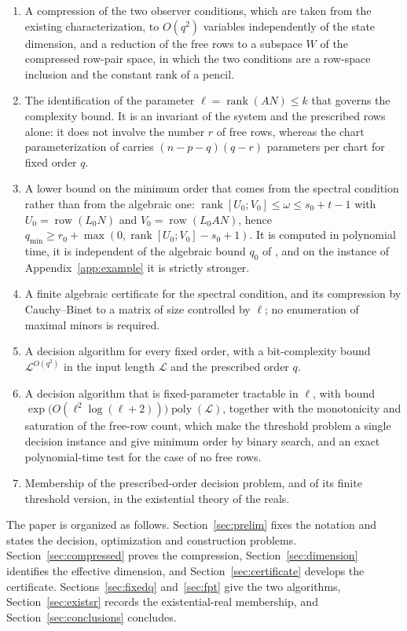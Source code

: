 \documentclass[journal]{IEEEtran}
\theoremstyle{plainn}
\theoremstyle{remark}
\begin{document}
\begin{enumerate}
\item A compression of the two observer conditions, which are taken from the existing
characterization, to $O(q^2)$ variables independently of the state dimension, and a
reduction of the free rows to a subspace $W$ of the compressed row-pair space, in which the
two conditions are a row-space inclusion and the constant rank of a pencil.
\item The identification of the parameter $\ell=\operatorname{rank}(AN)\le k$ that governs
the complexity bound. It is an invariant of the system and the prescribed rows alone: it does not
involve the number $r$ of free rows, whereas the chart parameterization of \cite{fer26b}
carries $(n-p-q)(q-r)$ parameters per chart for fixed order $q$.
\item A lower bound on the minimum order that comes from the spectral condition rather than
from the algebraic one: $\operatorname{rank}[U_0;V_0]\le\omega\le s_0+t-1$ with $U_0=\operatorname{row}(L_0N)$
and $V_0=\operatorname{row}(L_0AN)$, hence
$q_{\min}\ge r_0+\max(0,\operatorname{rank}[U_0;V_0]-s_0+1)$. It is computed in polynomial time,
it is independent of the algebraic bound $q_0$ of \cite{fer26a,fer26b}, and on the instance of
Appendix~\ref{app:example} it is strictly stronger.
\item A finite algebraic certificate for the spectral condition, and its compression by
Cauchy--Binet to a matrix of size controlled by $\ell$; no enumeration of maximal minors is
required.
\item A decision algorithm for every fixed order, with a bit-complexity bound
$\mathcal L^{O(q^2)}$ in the input length $\mathcal L$ and the prescribed order $q$.
\item A decision algorithm that is fixed-parameter tractable in $\ell$, with bound
$\exp\bigl(O(\ell^2\log(\ell+2))\bigr)\operatorname{poly}(\mathcal L)$, together with the
monotonicity and saturation of the free-row count, which make the threshold problem a single
decision instance and give minimum order by binary search, and an exact polynomial-time test
for the case of no free rows.
\item Membership of the prescribed-order decision problem, and of its finite threshold
version, in the existential theory of the reals.
\end{enumerate}

The paper is organized as follows. Section~\ref{sec:prelim} fixes the notation and states
the decision, optimization and construction problems. Section~\ref{sec:compressed} proves
the compression, Section~\ref{sec:dimension} identifies the effective dimension, and
Section~\ref{sec:certificate} develops the certificate. Sections~\ref{sec:fixedq}
and~\ref{sec:fpt} give the two algorithms, Section~\ref{sec:existsr} records the
existential-real membership, and Section~\ref{sec:conclusions} concludes.
\end{document}
